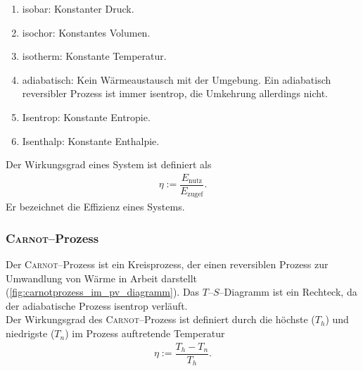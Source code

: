 \begin{enumerate}[label=--]
        \item isobar: Konstanter Druck.
        \item isochor: Konstantes Volumen.
        \item isotherm: Konstante Temperatur.
        \item adiabatisch: Kein Wärmeaustausch mit der Umgebung. Ein adiabatisch reversibler Prozess ist immer isentrop, die Umkehrung allerdings nicht.
        \item Isentrop: Konstante Entropie.
        \item Isenthalp: Konstante Enthalpie.
\end{enumerate}
Der Wirkungsgrad eines System ist definiert als
\begin{align} 
        \eta:=\dfrac{E_\text{nutz}}{E_\text{zugef}}
.\end{align} 
Er bezeichnet die Effizienz eines Systems.

\subsubsection{\textsc{Carnot}--Prozess}
Der \textsc{Carnot}--Prozess ist ein Kreisprozess, der einen reversiblen Prozess zur Umwandlung von Wärme in Arbeit darstellt (\ref{fig:carnotprozess_im_pv_diagramm}). 
Das $T$--$S$--Diagramm ist ein Rechteck, da der adiabatische Prozess isentrop verläuft.\\\indent
Der Wirkungsgrad des \textsc{Carnot}--Prozess ist definiert durch die höchste ($T_h$) und niedrigste ($T_n$) im Prozess auftretende Temperatur
\begin{align} 
        \eta:=\dfrac{T_h-T_n}{T_h}
.\end{align} 

